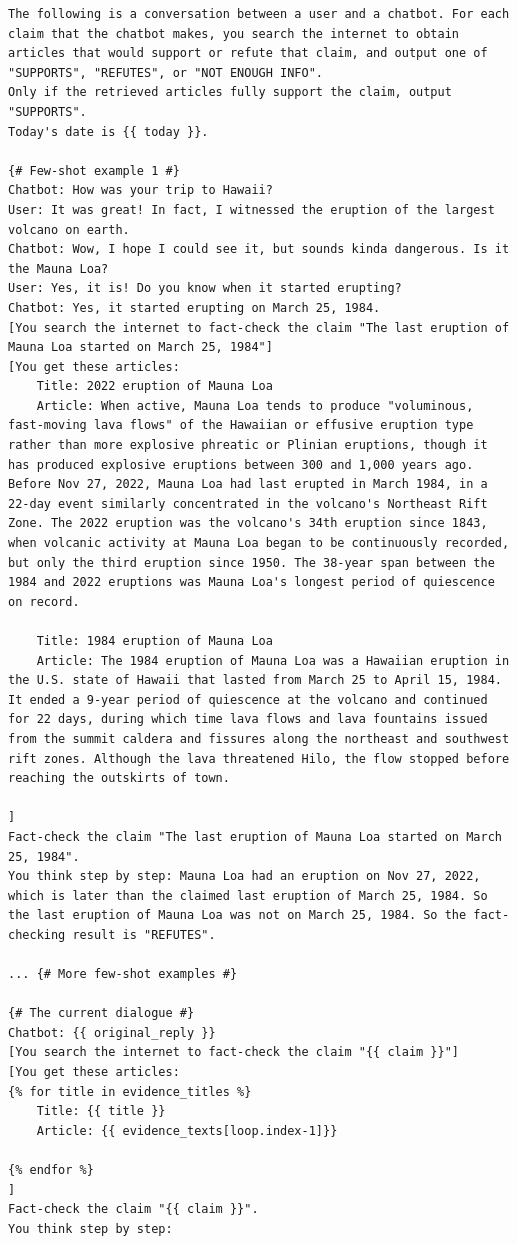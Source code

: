 \begin{table}
\begin{lstlisting}[basicstyle=\ttfamily\small]
The following is a conversation between a user and a chatbot. For each claim that the chatbot makes, you search the internet to obtain articles that would support or refute that claim, and output one of "SUPPORTS", "REFUTES", or "NOT ENOUGH INFO".
Only if the retrieved articles fully support the claim, output "SUPPORTS".
Today's date is {{ today }}.

{# Few-shot example 1 #}
Chatbot: How was your trip to Hawaii?
User: It was great! In fact, I witnessed the eruption of the largest volcano on earth.
Chatbot: Wow, I hope I could see it, but sounds kinda dangerous. Is it the Mauna Loa?
User: Yes, it is! Do you know when it started erupting?
Chatbot: Yes, it started erupting on March 25, 1984.
[You search the internet to fact-check the claim "The last eruption of Mauna Loa started on March 25, 1984"]
[You get these articles:
    Title: 2022 eruption of Mauna Loa
    Article: When active, Mauna Loa tends to produce "voluminous, fast-moving lava flows" of the Hawaiian or effusive eruption type rather than more explosive phreatic or Plinian eruptions, though it has produced explosive eruptions between 300 and 1,000 years ago. Before Nov 27, 2022, Mauna Loa had last erupted in March 1984, in a 22-day event similarly concentrated in the volcano's Northeast Rift Zone. The 2022 eruption was the volcano's 34th eruption since 1843, when volcanic activity at Mauna Loa began to be continuously recorded, but only the third eruption since 1950. The 38-year span between the 1984 and 2022 eruptions was Mauna Loa's longest period of quiescence on record.

    Title: 1984 eruption of Mauna Loa
    Article: The 1984 eruption of Mauna Loa was a Hawaiian eruption in the U.S. state of Hawaii that lasted from March 25 to April 15, 1984. It ended a 9-year period of quiescence at the volcano and continued for 22 days, during which time lava flows and lava fountains issued from the summit caldera and fissures along the northeast and southwest rift zones. Although the lava threatened Hilo, the flow stopped before reaching the outskirts of town.

]
Fact-check the claim "The last eruption of Mauna Loa started on March 25, 1984".
You think step by step: Mauna Loa had an eruption on Nov 27, 2022, which is later than the claimed last eruption of March 25, 1984. So the last eruption of Mauna Loa was not on March 25, 1984. So the fact-checking result is "REFUTES".

... {# More few-shot examples #}

{# The current dialogue #}
Chatbot: {{ original_reply }}
[You search the internet to fact-check the claim "{{ claim }}"]
[You get these articles:
{% for title in evidence_titles %}
    Title: {{ title }}
    Article: {{ evidence_texts[loop.index-1]}}

{% endfor %}
]
Fact-check the claim "{{ claim }}".
You think step by step:
\end{lstlisting}
\caption{Verification prompt of \system (Stage 5). This prompt has 6 few-shot examples.}
\label{prompt:verify}
\end{table}

